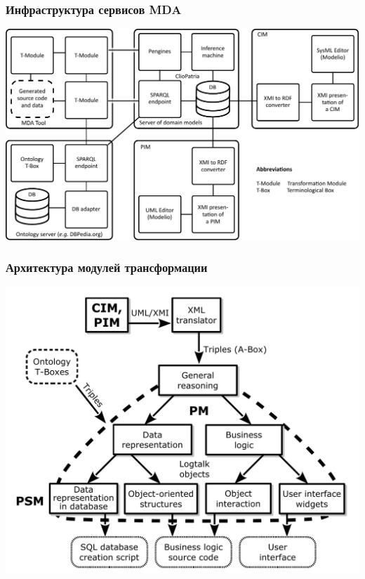 \documentclass[10pt]{beamer}
\begin{document}
\begin{frame}
  \frametitle{Инфраструктура сервисов MDA}
  \centering
  \includegraphics[width=1\linewidth]{architecture-mda-lod-ext.pdf}
\end{frame}
\begin{frame}
  \frametitle{Архитектура модулей трансформации}
  \centering
  \includegraphics[width=0.9\linewidth]{architect_tree_pres-en-wo-OCL.pdf}
\end{frame}
\end{document}

